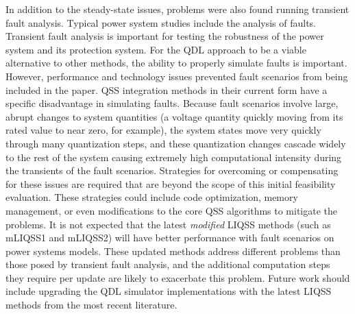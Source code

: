 In addition to the steady-state issues, problems were also found running transient fault analysis. Typical power system studies include the analysis of faults. Transient fault analysis is important for testing the robustness of the power system and its protection system. For the QDL approach to be a viable alternative to other methods, the ability to properly simulate faults is important. However, performance and technology issues prevented fault scenarios from being included in the paper. QSS integration methods in their current form have a specific disadvantage in simulating faults. Because fault scenarios involve large, abrupt changes to system quantities (a voltage quantity quickly moving from its rated value to near zero, for example), the system states move very quickly through many quantization steps, and these quantization changes cascade widely to the rest of the system causing extremely high computational intensity during the transients of the fault scenarios. Strategies for overcoming or compensating for these issues are required that are beyond the scope of this initial feasibility evaluation. These strategies could include code optimization, memory management, or even modifications to the core QSS algorithms to mitigate the problems. It is not expected that the latest \emph{modified} LIQSS methods (such as mLIQSS1 and mLIQSS2) will have better performance with fault scenarios on power systems models. These updated methods address different problems than those posed by transient fault analysis, and the additional computation steps they require per update are likely to exacerbate this problem. Future work should include upgrading the QDL simulator implementations with the latest LIQSS methods from the most recent literature.
